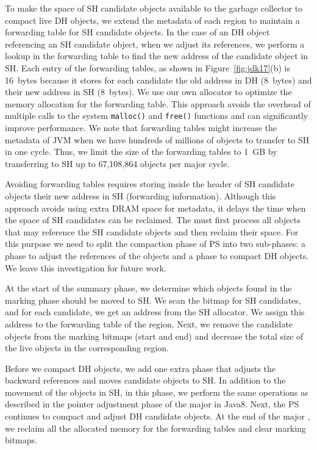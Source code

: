 To make the space of SH candidate objects available to the garbage collector to
compact live DH objects, we extend the metadata of each region to maintain a
forwarding table for SH candidate objects.  In the case of an DH object
referencing an SH candidate object, when we adjust its references, we perform a
lookup in the forwarding table to find the new address of the candidate object
in SH. Each entry of the forwarding tables, as shown in
Figure~\ref{fig:jdk17}(b) is \SI{16}{bytes} because it stores for each
candidate the old address in DH (\SI{8}{bytes}) and their new address in SH
(\SI{8}{bytes}). We use our own allocator to optimize the memory allocation for
the forwarding table. This approach avoids the overhead of multiple calls to
the system \texttt{malloc()} and \texttt{free()} functions and can
significantly improve performance. We note that forwarding tables might
increase the metadata of JVM when we have hundreds of millions of objects to
transfer to SH in one \teraheapGC cycle.  Thus, we limit the size of the forwarding
tables to \SI{1}{GB} by transferring to SH up to 67,108,864 objects per major
\teraheapGC cycle.

Avoiding forwarding tables requires storing inside the header of SH
candidate objects their new address in SH (forwarding information).
Although this approach avoids using extra DRAM space for metadata, it
delays the time when the space of SH candidates can be reclaimed. The
\teraheapGC must first process all objects that may reference the SH candidate
objects and then reclaim their space. For this purpose we need to
split the compaction phase of PS into two sub-phases: a phase to adjust
the references of the objects and a phase to compact DH objects. We
leave this investigation for future work.

At the start of the summary phase, we determine which objects found in
the marking phase should be moved to SH. We scan the bitmap for SH
candidates, and for each candidate, we get an address from the SH
allocator. We assign this address to the forwarding table of the
region.  Next, we remove the candidate objects from the marking
bitmaps (start and end) and decrease the total size of the live
objects in the corresponding region.

Before we compact DH objects, we add one extra phase that adjusts the
backward references and moves candidate objects to SH. In addition to
the movement of the objects in SH, in this phase, we perform the same
operations as described in the pointer adjustment phase of the major
\teraheapGC in Java8. Next, the PS continues to compact and adjust DH
candidate objects. At the end of the major \teraheapGC, we reclaim all the
allocated memory for the forwarding tables and clear marking bitmaps.

